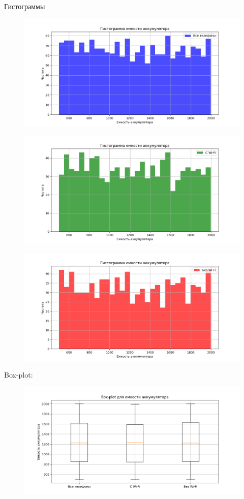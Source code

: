 \documentclass{article}
\begin{document}
Гистограммы
\begin{figure}[H]
      \centering
      \includegraphics[width=0.5\linewidth]{Python/hist-all-phones}\label{fig:figure7}
\end{figure}

\begin{figure}[H]
      \centering
      \includegraphics[width=0.5\linewidth]{Python/hist-wi-fi}\label{fig:figure8}
\end{figure}

\begin{figure}[H]
      \centering
      \includegraphics[width=0.5\linewidth]{Python/hist-without-wi-fi}\label{fig:figure9}
\end{figure}

Box-plot:
\begin{figure}[H]
      \centering
      \includegraphics[width=0.5\linewidth]{Python/box-plot}\label{fig:figure10}
\end{figure}
\end{document}
